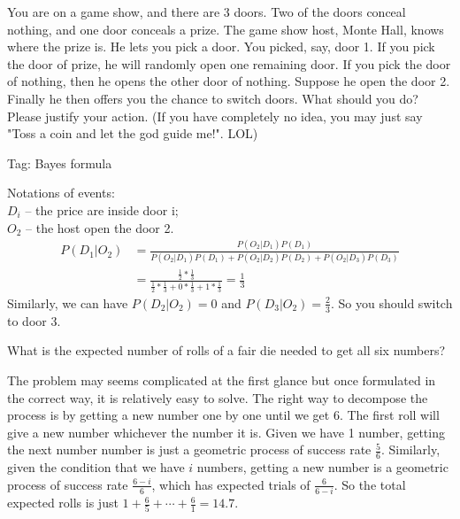 \begin{exe}
You are on a game show, and there are 3 doors. Two of the doors conceal nothing, and one door conceals a prize. The game show host, Monte Hall, knows where the prize is. He lets you pick a door. You picked, say, door 1. If you pick the door of prize, he will randomly open one remaining door. If you pick the door of nothing, then he opens the other door of nothing. Suppose he open the door 2. Finally he then offers you the chance to switch doors. What should you do? Please justify your action. (If you have completely no idea, you may just say "Toss a coin and let the god guide me!". LOL) 
\end{exe}
\begin{teacher}
Tag: Bayes formula
\begin{sol}
Notations of events:\\
$D_i$ -- the price are inside door i;\\
$O_2$ -- the host open the door 2.
\begin{align*}
    P(D_1|O_2) &= \frac{P(O_2|D_1)P(D_1)}{P(O_2|D_1)P(D_1)+P(O_2|D_2)P(D_2)+P(O_2|D_3)P(D_3)}\\
    &=\frac{\frac{1}{2}*\frac{1}{3}}{\frac{1}{2}*\frac{1}{3}+0*\frac{1}{3}+1*\frac{1}{3}}=\frac{1}{3}
\end{align*}
Similarly, we can have $P(D_2|O_2)=0$ and $P(D_3|O_2) = \frac{2}{3}$. So you should switch to door 3.
\end{sol}
\end{teacher}

\begin{exe}
What is the expected number of rolls of a fair die needed to get all six
numbers?
\end{exe}
\begin{teacher}
\begin{sol}
The problem may seems complicated at the first glance but once formulated in the correct way, it is relatively easy to solve. The right way to decompose the process is by getting a new number one by one until we get 6. The first roll will give a new number whichever the number it is. Given we have 1 number, getting the next number number is just a geometric process of success rate $\frac{5}{6}$. Similarly, given the condition that we have $i$ numbers, getting a new number is a geometric process of success rate $\frac{6-i}{6}$, which has expected trials of $\frac{6}{6-i}$. So the total expected rolls is just $1+\frac{6}{5}+\cdots+\frac{6}{1}=14.7$.
\end{sol}
\end{teacher}

